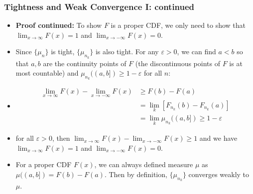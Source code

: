\documentclass[handout]{beamer}
\begin{document}
  \frame
{
  \frametitle{Tightness and Weak Convergence I: continued}

 \begin{itemize}

\item<1-> \textbf{Proof continued:} To show $F$ is a proper CDF, we only need to show that $\lim_{x\rightarrow \infty} F(x)=1$ and $\lim_{x\rightarrow -\infty} F(x)=0$.

\item<2->[-] Since $\{\mu_n\}$ is tight, $\{\mu_{n_k}\}$ is also tight. For any $\varepsilon>0$, we can find $a<b$ so that $a,b$ are the continuity points of $F$ (the discontinuous points of $F$ is at most countable) and $\mu_{n_k} ((a,b])\geq 1-\varepsilon$ for all $n$:
\item<3->[]\begin{align*}
\lim_{x\rightarrow \infty} F(x)-\lim_{x\rightarrow -\infty} F(x) & \geq F(b)-F(a)  \\ & =\lim_k [F_{n_k} (b)-F_{n_k} (a) ] \\ & =\lim_k \mu_{n_k} ((a,b])\geq 1-\varepsilon
\end{align*}
\item<4->[] for all $\varepsilon>0$, then $\lim_{x\rightarrow \infty} F(x)-\lim_{x\rightarrow -\infty} F(x) \geq 1$ and we have $\lim_{x\rightarrow \infty} F(x)=1$ and $\lim_{x\rightarrow -\infty} F(x)=0$.

\item<4->[-] For a proper CDF $F(x)$, we can always defined measure $\mu$ as $\mu((a,b])=F(b)-F(a)$. Then by definition, $\{\mu_{n_k}\}$ converges weakly to $\mu$. 
 
\end{itemize}
 }
 
\end{document}
